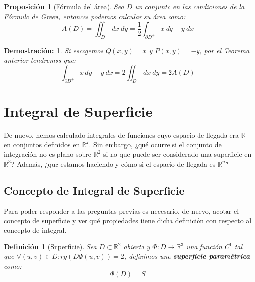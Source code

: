 \documentclass[10pt,a4paper,openright]{book}
\theoremstyle{break}
\newtheorem*{defi}{Definición}
\newtheorem*{prop}{Proposición}
\newtheorem*{demo}{\underline{Demostración}:}
\newcommand{\dif}[1]{\ d#1}
\begin{document}
\begin{prop}[Fórmula del área]
Sea $D$ un conjunto en las condiciones de la Fórmula de Green, entonces podemos calcular su área como:
$$A\left(D\right)=\iint_{D} \dif{x} \dif{y} = \frac{1}{2}\int_{\partial D^+} x \dif{y} - y \dif{x}$$
\end{prop}
\begin{demo}
Si escogemos $Q\left( x, y \right) = x$ y $P\left( x, y \right) = -y$, por el Teorema anterior tendremos que:
$$\int_{\partial D^+} x \dif{y} - y \dif{x} = 2\iint_{D} \dif{x} \dif{y} = 2 A\left(D\right)$$
\end{demo}

\section{Integral de Superficie}
De nuevo, hemos calculado integrales de funciones cuyo espacio de llegada era $\mathbb{R}$ en conjuntos definidos en $\mathbb{R}^2$. Sin embargo, ¿qué ocurre si el conjunto de integración no es plano sobre $\mathbb{R}^2$ si no que puede ser considerado una superficie en $\mathbb{R}^3$? Además, ¿qué estamos haciendo y cómo si el espacio de llegada es $\mathbb{R}^n$?

\subsection{Concepto de Integral de Superficie}
Para poder responder a las preguntas previas es necesario, de nuevo, acotar el concepto de superficie y ver qué propiedades tiene dicha definición con respecto al concepto de integral.

\begin{defi}[Superficie]
Sea $D \subset  \mathbb{R}^2$ abierto y $\Phi: D \rightarrow \mathbb{R}^3$ una función $C^1$ tal que $\forall \left( u, v \right) \in D : rg\left(D\Phi\left( u, v \right) \right)= 2$, definimos una \textbf{superficie paramétrica} como: 
$$\Phi\left( D \right) = S$$
\end{defi}
\end{document}
